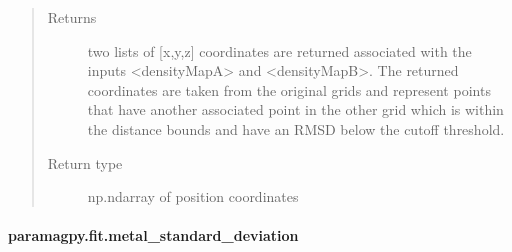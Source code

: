 \documentclass[a4paper,10pt,english,openany,oneside]{sphinxmanual}
\begin{document}
\begin{fulllineitems}
\begin{quote}
\begin{description}
\begin{itemize}
\end{itemize}

\item[{Returns}] \leavevmode
{} \textendash{} two lists of {[}x,y,z{]} coordinates are returned associated
with the inputs \textless{}densityMapA\textgreater{} and \textless{}densityMapB\textgreater{}.
The returned coordinates are taken from the original grids
and represent points that have another associated point in
the other grid which is within the distance bounds and
have an RMSD below the cutoff threshold.

\item[{Return type}] \leavevmode
np.ndarray of position coordinates

\end{description}\end{quote}

\end{fulllineitems}



\paragraph{paramagpy.fit.metal\_standard\_deviation}
\label{\detokenize{reference/generated/paramagpy.fit.metal_standard_deviation:paramagpy-fit-metal-standard-deviation}}\label{\detokenize{reference/generated/paramagpy.fit.metal_standard_deviation::doc}}
\end{document}
